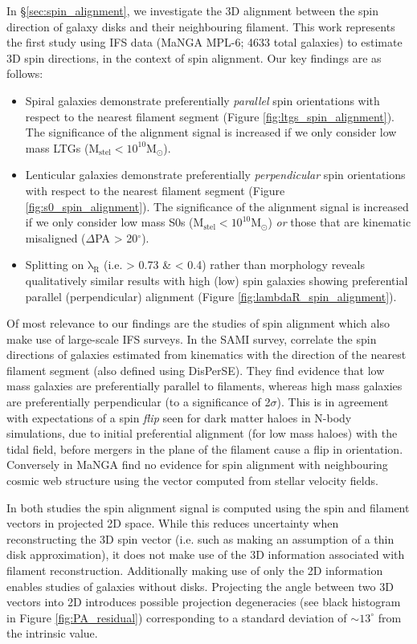 In \S\ref{sec:spin_alignment}, we investigate the 3D alignment between the spin direction of galaxy disks and their neighbouring filament. This work represents the first study using IFS data (MaNGA MPL-6; 4633 total galaxies) to estimate 3D spin directions, in the context of spin alignment. Our key findings are as follows: 
\begin{itemize}
    \item Spiral galaxies demonstrate preferentially \textit{parallel} spin orientations with respect to the nearest filament segment (Figure \ref{fig:ltgs_spin_alignment}). The significance of the alignment signal is increased if we only consider low mass LTGs ($\mathrm{M_{stel} < 10^{10} M_{\odot}}$). 
    \item Lenticular galaxies demonstrate preferentially \textit{perpendicular} spin orientations with respect to the nearest filament segment (Figure \ref{fig:s0_spin_alignment}). The significance of the alignment signal is increased if we only consider low mass S0s ($\mathrm{M_{stel} < 10^{10} M_{\odot}}$) \textit{or} those that are kinematic misaligned ($\Delta$PA > 20$^{\circ}$). 
    \item Splitting on $\mathrm{\lambda_R}$ (i.e. > 0.73 \& < 0.4) rather than morphology reveals qualitatively similar results with high (low) spin galaxies showing preferential parallel (perpendicular) alignment (Figure \ref{fig:lambdaR_spin_alignment}). 
\end{itemize}
Of most relevance to our findings are the studies of spin alignment which also make use of large-scale IFS surveys. In the SAMI survey, \citet{welker2020} correlate the spin directions of galaxies estimated from kinematics with the direction of the nearest filament segment (also defined using DisPerSE). They find evidence that low mass galaxies are preferentially parallel to filaments, whereas high mass galaxies are preferentially perpendicular (to a significance of 2$\sigma$). This is in agreement with expectations of a spin \textit{flip} seen for dark matter haloes in N-body simulations, due to initial preferential alignment (for low mass haloes) with the tidal field, before mergers in the plane of the filament cause a flip in orientation. Conversely in MaNGA \citet{krolewski2019} find no evidence for spin alignment with neighbouring cosmic web structure using the vector computed from stellar velocity fields. 

In both studies the spin alignment signal is computed using the spin and filament vectors in projected 2D space. While this reduces uncertainty when reconstructing the 3D spin vector (i.e. such as making an assumption of a thin disk approximation), it does not make use of the 3D information associated with filament reconstruction. Additionally making use of only the 2D information enables studies of galaxies without disks. Projecting the angle between two 3D vectors into 2D introduces possible projection degeneracies (see black histogram in Figure \ref{fig:PA_residual}) corresponding to a standard deviation of $\sim 13^{\circ}$ from the intrinsic value. 

